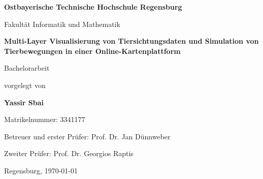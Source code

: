 \documentclass[12pt,a4paper]{report}
\begin{document}


\begin{titlepage}
    \begin{singlespace}
    \centering
    \vspace*{1.2cm}

    {\Large\bfseries Ostbayerische Technische Hochschule Regensburg\par}
    \vspace{0.3cm}
    {\large Fakultät Informatik und Mathematik\par}

    \vspace{2cm}

    {\LARGE\bfseries
    Multi-Layer Visualisierung von Tiersichtungsdaten
    und Simulation von Tierbewegungen
    in einer Online-Kartenplattform\par}

    \vspace{1.8cm}

    {\Large Bachelorarbeit\par}

    \vspace{0.8cm}

    vorgelegt von\par
    \vspace{0.3cm}
    {\Large\bfseries Yassir Sbai\par}
    \vspace{0.2cm}
    Matrikelnummer: 3341177

    \vspace{1.8cm}

    Betreuer und erster Prüfer:
    Prof. Dr. Jan Dünnweber\par
    \vspace{0.4cm}
    Zweiter Prüfer:
    Prof. Dr. Georgios Raptis\par

    \vfill

    Regensburg, \today

    \end{singlespace}
\end{titlepage}




\tableofcontents
\clearpage

{}
\listoffigures
\clearpage
\end{document}
